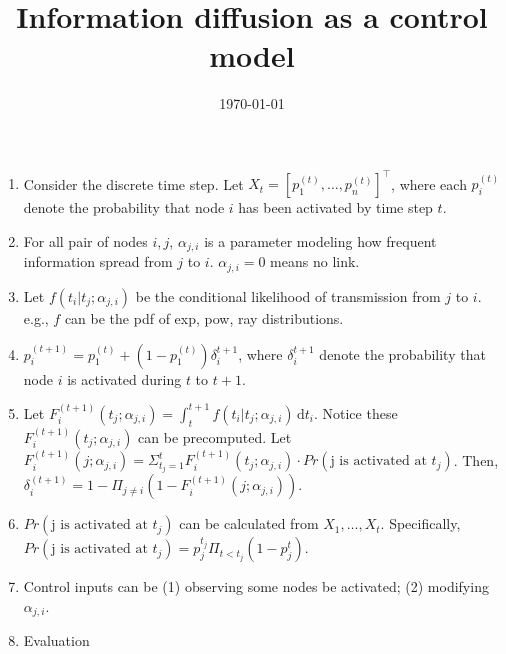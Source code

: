 \documentclass[11pt]{article}
\title{Information diffusion as a control model}
\date{\today}
\begin{document}
\maketitle
\begin{enumerate}
\item Consider the discrete time step. Let $X_{t} = [p_{1}^{(t)}, \dots, p_{n}^{(t)}]^{\top}$, where each $p_{i}^{(t)}$ denote the probability that node $i$ has been activated by time step $t$.
\item For all pair of nodes $i,j$, $\alpha_{j,i}$ is a parameter modeling how frequent information spread from $j$ to $i$. $\alpha_{j,i}=0$ means no link.  
\item Let $f(t_{i}|t_{j}; \alpha_{j,i})$ be the conditional likelihood of transmission from $j$ to $i$. e.g., $f$ can be the pdf of exp, pow, ray distributions.
\item $p_{i}^{(t+1)} = p_{1}^{(t)} + (1-p_{1}^{(t)})\delta_{i}^{t+1} $, where $\delta_{i}^{t+1}$ denote the probability that node $i$ is activated during $t$ to $t+1$.
\item Let $F_{i}^{(t+1)} (t_{j}; \alpha_{j,i}) = \int_t^{t+1} \! f(t_{i}|t_{j}; \alpha_{j,i}) \, \mathrm{d}t_{i}$. Notice these $F_{i}^{(t+1)} (t_{j}; \alpha_{j,i})$ can be precomputed.
Let $F_{i}^{(t+1)}(j;\alpha_{j,i}) = \Sigma_{t_j=1}^{t} F_{i}^{(t+1)} (t_{j}; \alpha_{j,i}) \cdot Pr(\text{j is activated at $t_{j}$})$. Then, $\delta_{i}^{(t+1)} = 1- \Pi_{j\neq i} (1- F_{i}^{(t+1)}(j;\alpha_{j,i}))$.
\item $Pr(\text{j is activated at $t_{j}$})$ can be calculated from $X_{1}, \dots, X_{t}$. Specifically, $Pr(\text{j is activated at $t_{j}$}) = p_{j}^{t_{j}}\Pi_{t<t_{j}} (1-p_{j}^{t})$.
\item Control inputs can be (1) observing some nodes be activated; (2) modifying $\alpha_{j,i}$.
\item Evaluation
\end{enumerate}
\end{document}
